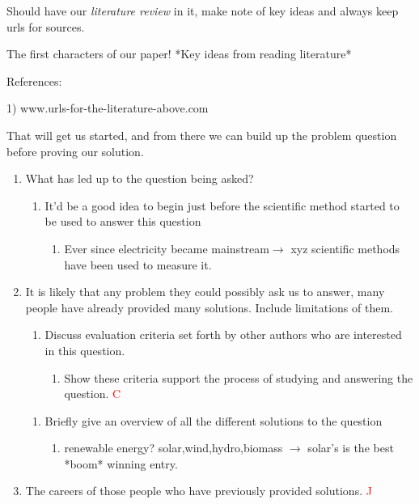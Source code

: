 Should have our \emph{literature review} in it, make note of key ideas and always keep urls for sources. 
  \begin{noot}{The first characters of our paper!}
  *Key ideas from reading literature*

  References:

	  1) www.urls-for-the-literature-above.com
\end{noot}
That will get us started, and from there we can build up the problem question before proving our solution.
\begin{enumerate}
	\item What has led up to the question being asked?
	\begin{enumerate}
		\item It'd be a good idea to begin just before the scientific method started to be used to answer this question
		\begin{enumerate}
			\item Ever since electricity became mainstream$\to$ xyz scientific methods have been used to measure it. 
		\end{enumerate}
	\end{enumerate}
	\item It is likely that any problem they could possibly ask us to answer, many people have already provided many solutions. Include limitations of them. 
		\begin{enumerate}
			\item Discuss evaluation criteria set forth by other authors who are interested in this question.
				\begin{enumerate}
					\item Show these criteria support the process of studying and answering the question. \hfill\textcolor{red}{C}
				\end{enumerate}
		\end{enumerate}
		\begin{enumerate}
			\item Briefly give an overview of all the different solutions to the question
\begin{enumerate}
	\item renewable energy? solar,wind,hydro,biomass $\to$ solar's is the best *boom* winning entry.
\end{enumerate}
		\end{enumerate}
	\item The careers of those people who have previously provided solutions. \hfill \textcolor{red}{J}
\begin{enumerate}

\end{enumerate}
\end{enumerate}
